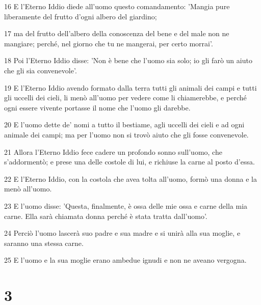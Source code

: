 \par 16 E l'Eterno Iddio diede all'uomo questo comandamento: 'Mangia pure liberamente del frutto d'ogni albero del giardino;
\par 17 ma del frutto dell'albero della conoscenza del bene e del male non ne mangiare; perché, nel giorno che tu ne mangerai, per certo morrai'.
\par 18 Poi l'Eterno Iddio disse: 'Non è bene che l'uomo sia solo; io gli farò un aiuto che gli sia convenevole'.
\par 19 E l'Eterno Iddio avendo formato dalla terra tutti gli animali dei campi e tutti gli uccelli dei cieli, li menò all'uomo per vedere come li chiamerebbe, e perché ogni essere vivente portasse il nome che l'uomo gli darebbe.
\par 20 E l'uomo dette de' nomi a tutto il bestiame, agli uccelli dei cieli e ad ogni animale dei campi; ma per l'uomo non si trovò aiuto che gli fosse convenevole.
\par 21 Allora l'Eterno Iddio fece cadere un profondo sonno sull'uomo, che s'addormentò; e prese una delle costole di lui, e richiuse la carne al posto d'essa.
\par 22 E l'Eterno Iddio, con la costola che avea tolta all'uomo, formò una donna e la menò all'uomo.
\par 23 E l'uomo disse: 'Questa, finalmente, è ossa delle mie ossa e carne della mia carne. Ella sarà chiamata donna perché è stata tratta dall'uomo'.
\par 24 Perciò l'uomo lascerà suo padre e sua madre e si unirà alla sua moglie, e saranno una stessa carne.
\par 25 E l'uomo e la sua moglie erano ambedue ignudi e non ne aveano vergogna.

\chapter{3}

